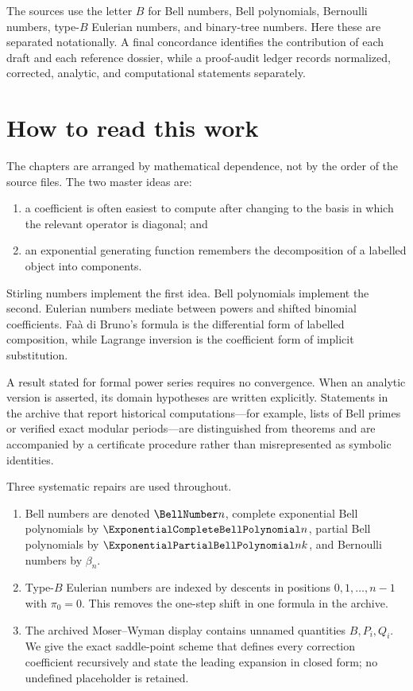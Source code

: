 \documentclass[11pt,a4paper,oneside,openany]{book}
\theoremstyle{definition}
\theoremstyle{remark}
\begin{document}
The sources use the letter $B$ for Bell numbers, Bell polynomials, Bernoulli numbers,
type-$B$ Eulerian numbers, and binary-tree numbers.  Here these are separated
notationally.  A final concordance identifies the contribution of each draft and each
reference dossier, while a proof-audit ledger records normalized, corrected, analytic,
and computational statements separately.

\chapter*{How to read this work}
The chapters are arranged by mathematical dependence, not by the order of the source
files.  The two master ideas are:
\begin{enumerate}
  \item a coefficient is often easiest to compute after changing to the basis in
        which the relevant operator is diagonal; and
  \item an exponential generating function remembers the decomposition of a
        labelled object into components.
\end{enumerate}
Stirling numbers implement the first idea.  Bell polynomials implement the second.
Eulerian numbers mediate between powers and shifted binomial coefficients.  Fa\`a di
Bruno's formula is the differential form of labelled composition, while Lagrange
inversion is the coefficient form of implicit substitution.

A result stated for formal power series requires no convergence.  When an analytic
version is asserted, its domain hypotheses are written explicitly.  Statements in
the archive that report historical computations---for example, lists of Bell
primes or verified exact modular periods---are distinguished from theorems and are
accompanied by a certificate procedure rather than misrepresented as symbolic
identities.

\begin{auditbox}
Three systematic repairs are used throughout.
\begin{enumerate}
\item Bell numbers are denoted $\BellNumber n$, complete exponential Bell polynomials by
      $\ExponentialCompleteBellPolynomial n$, partial Bell polynomials by $\ExponentialPartialBellPolynomial nk$, and Bernoulli numbers by
      $\beta_n$.
\item Type-$B$ Eulerian numbers are indexed by descents in positions
      $0,1,\ldots,n-1$ with $\pi_0=0$.  This removes the one-step shift in one formula
      in the archive.
\item The archived Moser--Wyman display contains unnamed quantities
      $B,P_i,Q_i$.  We give the exact saddle-point scheme that defines every
      correction coefficient recursively and state the leading expansion in closed
      form; no undefined placeholder is retained.
\end{enumerate}
\end{auditbox}
\end{document}
